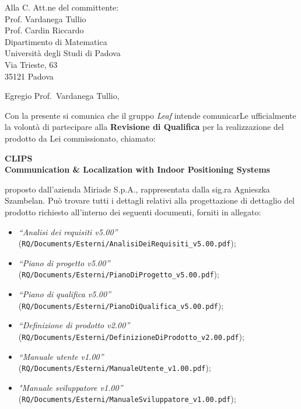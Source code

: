 \documentclass[a4paper,12pt]{letteracdp}
\author{Davide Castello}
\date{16 maggio 2016}
\begin{document}
	\begin{letter}{
		Alla C. Att.ne del committente: \\
		Prof. Vardanega Tullio \\
		Prof. Cardin Riccardo \\
		Dipartimento di Matematica \\
		Università degli Studi di Padova \\
		Via Trieste, 63 \\
		35121 Padova}
		
		\opening{Egregio Prof.~Vardanega Tullio,}
		Con la presente si comunica che il gruppo \textit{Leaf} intende comunicarLe ufficialmente la volontà di partecipare alla \textbf{Revisione di Qualifica} per la realizzazione del prodotto da Lei commissionato, chiamato:
\begin{center}
	\textbf{CLIPS \\ Communication \& Localization with Indoor Positioning Systems}
\end{center}
proposto dall'azienda Miriade S.p.A., rappresentata dalla sig.ra Agnieszka Szambelan.
Può trovare tutti i dettagli relativi alla progettazione di dettaglio del prodotto richiesto all'interno dei seguenti documenti, forniti in allegato:
%
\begin{itemize}
	\item \textit{“Analisi dei requisiti v5.00”} \\(\texttt{RQ/Documents/Esterni/AnalisiDeiRequisiti\_v5.00.pdf});

	\item \textit{“Piano di progetto v5.00”} \\(\texttt{RQ/Documents/Esterni/PianoDiProgetto\_v5.00.pdf});

	\item \textit{“Piano di qualifica v5.00”} \\(\texttt{RQ/Documents/Esterni/PianoDiQualifica\_v5.00.pdf});
	
	\item \textit{“Definizione di prodotto v2.00”} \\(\texttt{RQ/Documents/Esterni/DefinizioneDiProdotto\_v2.00.pdf});
	
	\item \textit{“Manuale utente v1.00”} \\(\texttt{RQ/Documents/Esterni/ManualeUtente\_v1.00.pdf});
	
	\item \textit{"Manuale sviluppatore v1.00”} \\(\texttt{RQ/Documents/Esterni/ManualeSviluppatore\_v1.00.pdf});
	

\end{itemize}
\end{letter}
\end{document}
